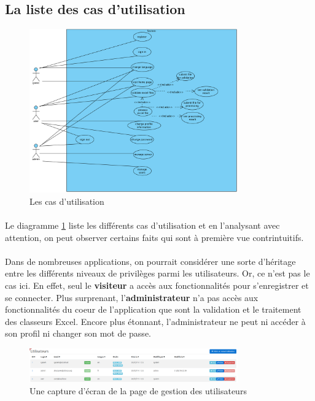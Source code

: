 \subsection{La liste des cas d'utilisation}
\label{subsec:use-cases-list}

\begin{figure}[ht]
    \centering
    \includegraphics[width=0.8\textwidth]{images/diagrams/use-cases-macro.png}
    \caption{Les cas d'utilisation}
    \label{fig:use-cases-macro}
\end{figure}

\paragraph{}
Le diagramme \ref{fig:use-cases-macro} liste les différents cas d'utilisation et en l'analysant avec attention, on peut observer certains faits qui sont à première vue contrintuitifs.

\paragraph{}
Dans de nombreuses applications, on pourrait considérer une sorte d'héritage entre les différents niveaux de privilèges parmi les utilisateurs. Or, ce n'est pas le cas ici. En effet, seul le \textbf{visiteur} a accès aux fonctionnalités pour s'enregistrer et se connecter. Plus surprenant, l'\textbf{administrateur} n'a pas accès aux fonctionnalités du coeur de l'application que sont la validation et le traitement des classeurs Excel. Encore plus étonnant, l'administrateur ne peut ni accéder à son profil ni changer son mot de passe.

\begin{figure}[ht]
    \centering
    \includegraphics[width=0.8\textwidth]{images/screenshot/screenshot-user-admin-page.png}
    \caption{Une capture d'écran de la page de gestion des utilisateurs}
    \label{fig:user-admin-page}
\end{figure}


